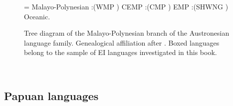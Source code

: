 \begin{figure}
\begin{center}
\begin{footnotesize}
\jtree[xunit=8em,yunit=2em]
\! = {Malayo-Polynesian}
:({WMP} {}) {CEMP}
:({CMP} {}) {EMP}
:({SHWNG} {}) {Oceanic}.
\endjtree
\end{footnotesize}
\end{center}
\caption[The Malayo-Polynesian branch of Austronesian]{Tree diagram of the Malayo-Polynesian branch of the Austronesian language family. Genealogical affiliation after \citealt{adelaar2005austronesian}. Boxed languages belong to the sample of EI languages investigated in this book.}\label{fig:Austro}
\end{figure}
\

\subsection{Papuan languages}

